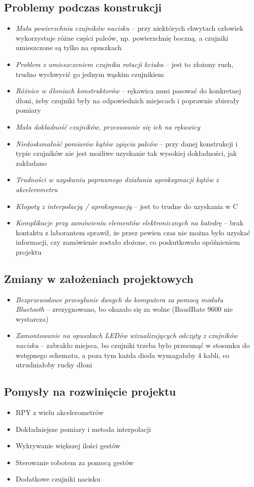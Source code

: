 \documentclass[12pt,a4paper]{article}
\begin{document}
\subsection{Problemy podczas konstrukcji}
\begin{itemize}
\item \textit{Mała powierzchnia czujników nacisku} -- przy niektórych chwytach człowiek wykorzystuje różne części palców, np. powierzchnię boczną, a czujniki umieszczone są tylko na opuszkach
\item \textit{Problem z umieszczeniem czujnika rotacji kciuka} -- jest to złożony ruch, trudno wychwycić go jednym wąskim czujnikiem
\item \textit{Różnice w dłoniach konstruktorów} -- rękawica musi pasować do konkretnej dłoni, żeby czujniki były na odpowiednich miejscach i poprawnie zbierały pomiary
\item \textit{Mała dokładność czujników, przesuwanie się ich na rękawicy}
\item \textit{Niedoskonałość pomiarów kątów zgięcia palców} -- przy danej konstrukcji i typie czujników nie jest możliwe uzyskanie tak wysokiej dokładności, jak zakładano
\item \textit{Trudności w uzyskaniu poprawnego działania aproksymacji kątów z akcelerometru}
\item \textit{Kłopoty z interpolacją / aproksymacją} -- jest to trudne do uzyskania w C
\item \textit{Komplikacje przy zamówieniu elementów elektronicznych na katedrę} -- brak kontaktu z laborantem sprawił, że przez pewien czas nie można było uzyskać informacji, czy zamówienie zostało złożone, co poskutkowało opóźnieniem projektu
\end{itemize}
\subsection{Zmiany w założeniach projektowych}
\begin{itemize}
\item \textit{Bezprzewodowe przesyłanie danych do komputera za pomocą modułu Bluetooth} -- zrezygnowano, bo okazało się za wolne (BaudRate 9600 nie wystarcza)
\item \textit{Zamontowanie na opuszkach LEDów wizualizujących odczyty z czujników nacisku} -- zabrakło miejsca, bo czujniki trzeba było przesunąć w stosunku do wstępnego schematu, a poza tym każda dioda wymagałaby 4 kabli, co utrudniałoby ruchy dłoni
\end{itemize}
\subsection{Pomysły na rozwinięcie projektu}
\begin{itemize}
\item RPY z wielu akcelerometrów
\item Dokładniejsze pomiary i metoda interpolacji
\item Wykrywanie większej ilości gestów
\item Sterowanie robotem za pomocą gestów
\item Dodatkowe czujniki nacisku
\end{itemize}
\end{document}
